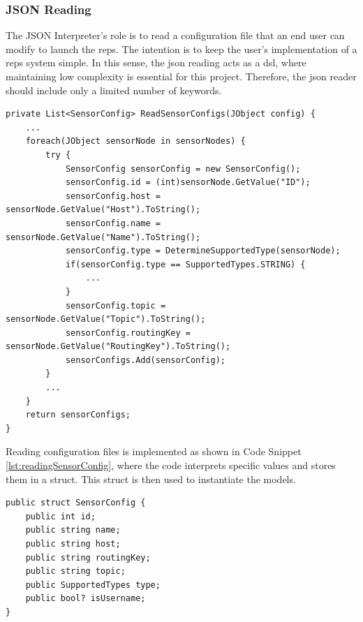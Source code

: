 	\subsubsection{JSON Reading}
		The JSON Interpreter's role is to read a configuration file that an end user can modify to launch the \gls{reps}. The intention is to keep the user’s implementation of a \gls{reps} system simple. In this sense, the \gls{json} reading acts as a \gls{dsl}, where maintaining low complexity is essential for this project. Therefore, the \gls{json} reader should include only a limited number of keywords.
		{\scriptsize\begin{lstlisting}[language={[sharp]C},caption={Reading Sensor Configs},label=lst:readingSensorConfig]
private List<SensorConfig> ReadSensorConfigs(JObject config) {
	...
	foreach(JObject sensorNode in sensorNodes) {
		try {
			SensorConfig sensorConfig = new SensorConfig();
			sensorConfig.id = (int)sensorNode.GetValue("ID");
			sensorConfig.host = sensorNode.GetValue("Host").ToString();
			sensorConfig.name = sensorNode.GetValue("Name").ToString();
			sensorConfig.type = DetermineSupportedType(sensorNode);
			if(sensorConfig.type == SupportedTypes.STRING) {
				...
			}
			sensorConfig.topic = sensorNode.GetValue("Topic").ToString();
			sensorConfig.routingKey = sensorNode.GetValue("RoutingKey").ToString();
			sensorConfigs.Add(sensorConfig);
		}
		...
	}
	return sensorConfigs;
}
		\end{lstlisting}}
			Reading configuration files is implemented as shown in Code Snippet \ref{lst:readingSensorConfig}, where the code interprets specific values and stores them in a struct. This struct is then used to instantiate the models.
		
		{\scriptsize\begin{lstlisting}[language={[sharp]C}, caption={SensorConfig}, label=lst:SensorConfig]
public struct SensorConfig {
	public int id;
	public string name;
	public string host;
	public string routingKey;
	public string topic;
	public SupportedTypes type;
	public bool? isUsername;
}
		\end{lstlisting}}
	
